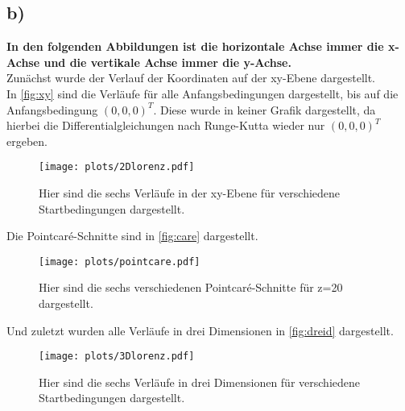 \subsection{b)}
\textbf{In den folgenden Abbildungen ist die horizontale Achse immer die x-Achse und die vertikale Achse immer die y-Achse.}\\
Zunächst wurde der Verlauf der Koordinaten auf der xy-Ebene dargestellt.\\
In \autoref{fig:xy} sind die Verläufe für alle Anfangsbedingungen dargestellt, bis auf die Anfangsbedingung $\left(0,0,0\right)^T$.
Diese wurde in keiner Grafik dargestellt, da hierbei die Differentialgleichungen nach Runge-Kutta wieder nur $\left(0,0,0\right)^T$ ergeben.
\begin{figure}[H]
    \centering
    \texttt{[image: plots/2Dlorenz.pdf]}
    \caption{Hier sind die sechs Verläufe in der xy-Ebene für verschiedene Startbedingungen dargestellt.}
    \label{fig:xy}
\end{figure}
Die Pointcaré-Schnitte sind in \autoref{fig:care} dargestellt.
\begin{figure}[H]
    \centering
    \texttt{[image: plots/pointcare.pdf]}
    \caption{Hier sind die sechs verschiedenen Pointcaré-Schnitte für z=20 dargestellt.}
    \label{fig:care}
\end{figure}
Und zuletzt wurden alle Verläufe in drei Dimensionen in \autoref{fig:dreid} dargestellt.
\begin{figure}[H]
    \centering
    \texttt{[image: plots/3Dlorenz.pdf]}
    \caption{Hier sind die sechs Verläufe in drei Dimensionen für verschiedene Startbedingungen dargestellt.}
    \label{fig:dreid}
\end{figure}